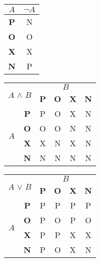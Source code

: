 \documentclass[a4paper, 11pt]{article}
\begin{document}
    \begin{table}[h] 
        \begin{center}
            \begin{tabular}{|c|c|}
                \hline
                    $A$ & $\neg A$\\ \hline
                    \textbf{P} & N  \\ \hline
                    \textbf{O} & O  \\ \hline
                    \textbf{X} & X  \\ \hline
                    \textbf{N} & P  \\ \hline
            \end{tabular}
            \begin{tabular}{|c|c|c|c|c|c|} 
                \hline
                    \multicolumn{2}{|l|}{\multirow{2}{*}{$A$ $\wedge$ $B$}} & \multicolumn{4}{c|}{$B$}  \\ \cline{3-6} 
                    \multicolumn{2}{|c|}{} & \textbf{P} & \textbf{O} & \textbf{X} & \textbf{N} \\ \hline
                    \multirow{4}{*}{$A$} & \textbf{P} & P & O & X & N \\ \cline{2-6} 
                    & \textbf{O} & O & O & N & N \\ \cline{2-6}  
                     & \textbf{X} & X & N & X & N \\ \cline{2-6} 
                     & \textbf{N} & N & N & N & N \\ \hline 
            \end{tabular}
            \begin{tabular}{|c|c|c|c|c|c|} 
                \hline
                    \multicolumn{2}{|l|}{\multirow{2}{*}{$A$ $\vee$ $B$}} & \multicolumn{4}{c|}{$B$}  \\ \cline{3-6} 
                    \multicolumn{2}{|c|}{} & \textbf{P} & \textbf{O} & \textbf{X} & \textbf{N} \\ \hline
                    \multirow{4}{*}{$A$} & \textbf{P} & P & P & P & P \\ \cline{2-6} 
                    & \textbf{O} & P & O & P & O \\ \cline{2-6}  
                     & \textbf{X} & P & P & X & X \\ \cline{2-6} 
                     & \textbf{N} & P & O & X & N \\ \hline 
            \end{tabular}
            \begin{tabular}{|c|c|c|c|c|c|} 

\end{tabular}
\end{center}
\end{table}
\end{document}
